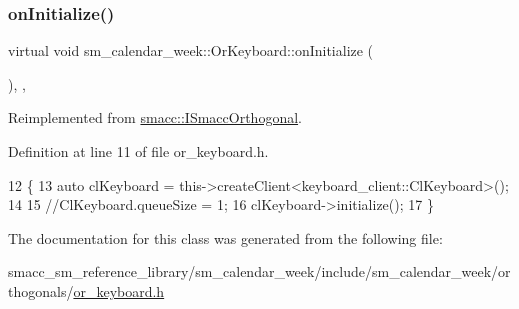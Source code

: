 \subsubsection{\texorpdfstring{on\+Initialize()}{onInitialize()}}
{\footnotesize\ttfamily virtual void sm\+\_\+calendar\+\_\+week\+::\+Or\+Keyboard\+::on\+Initialize (\begin{DoxyParamCaption}{ }\end{DoxyParamCaption})\hspace{0.3cm}{\ttfamily [inline]}, {\ttfamily [override]}, {\ttfamily [virtual]}}



Reimplemented from \hyperlink{classsmacc_1_1ISmaccOrthogonal_a6bb31c620cb64dd7b8417f8705c79c7a}{smacc\+::\+I\+Smacc\+Orthogonal}.



Definition at line 11 of file or\+\_\+keyboard.\+h.


\begin{DoxyCode}
12     \{
13         \textcolor{keyword}{auto} clKeyboard = this->createClient<keyboard\_client::ClKeyboard>();
14         
15         \textcolor{comment}{//ClKeyboard.queueSize = 1;}
16         clKeyboard->initialize();
17     \}
\end{DoxyCode}


The documentation for this class was generated from the following file\+:\begin{DoxyCompactItemize}
\item 
smacc\+\_\+sm\+\_\+reference\+\_\+library/sm\+\_\+calendar\+\_\+week/include/sm\+\_\+calendar\+\_\+week/orthogonals/\hyperlink{sm__calendar__week_2include_2sm__calendar__week_2orthogonals_2or__keyboard_8h}{or\+\_\+keyboard.\+h}\end{DoxyCompactItemize}
